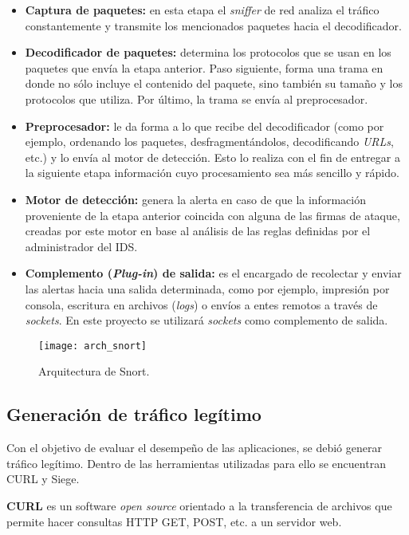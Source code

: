 \begin{itemize}
\item \textbf{Captura de paquetes:} en esta etapa el \textit{sniffer} de red
  analiza el tráfico constantemente y transmite los mencionados paquetes hacia
  el decodificador.
\item \textbf{Decodificador de paquetes:} determina los protocolos que se usan
  en los paquetes que envía la etapa anterior. Paso siguiente, forma una trama
  en donde no sólo incluye el contenido del paquete, sino también su tamaño y
  los protocolos que utiliza. Por último, la trama se envía al preprocesador.
\item \textbf{Preprocesador:} le da forma a lo que recibe del decodificador
  (como por ejemplo, ordenando los paquetes, desfragmentándolos, decodificando
  \textit{URLs}, etc.) y lo envía al motor de detección. Esto lo realiza con el
  fin de entregar a la siguiente etapa información cuyo procesamiento sea más
  sencillo y rápido.
\item \textbf{Motor de detección:} genera la alerta en caso de que la
  información proveniente de la etapa anterior coincida con alguna de las firmas
  de ataque, creadas por este motor en base al análisis de las reglas definidas
  por el administrador del IDS.
\item \textbf{Complemento (\textit{Plug-in}) de salida:} es el encargado de
  recolectar y enviar las alertas hacia una salida determinada, como por ejemplo,
  impresión por consola, escritura en archivos (\textit{logs}) o envíos a entes
  remotos a través de \textit{sockets}. En este proyecto se utilizará \textit{sockets}
  como complemento de salida.

\end {itemize}

\begin{figure}[!]
	\centering 
	\texttt{[image: arch\_snort]}
	\caption{Arquitectura de Snort.}
	\label{fig:arch_snort}
\end{figure}


\subsection{Generación de tráfico legítimo}
Con el objetivo de evaluar el desempeño de las aplicaciones, se debió generar
tráfico legítimo. Dentro de las herramientas utilizadas para ello se encuentran CURL y
Siege.

\textbf{CURL} es un software \textit{open source} orientado a la transferencia de
archivos que permite hacer consultas HTTP GET, POST, etc. a un servidor
web. %

